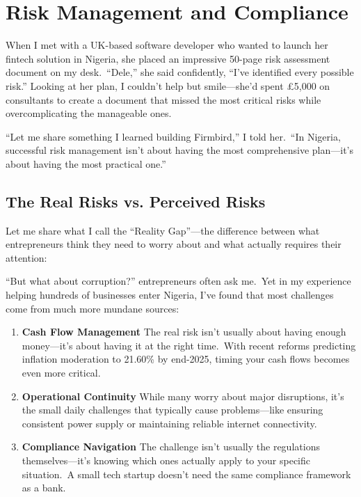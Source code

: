 \chapter{Risk Management and Compliance}\label{ch:risk-management-and-compliance}

\begin{importantbox}
When I met with a UK-based software developer who wanted to launch her fintech solution in Nigeria, she placed an impressive 50-page risk assessment document on my desk.\ ``Dele,'' she said confidently, ``I've identified every possible risk.'' Looking at her plan, I couldn't help but smile—she'd spent £5,000 on consultants to create a document that missed the most critical risks while overcomplicating the manageable ones.

``Let me share something I learned building Firmbird,'' I told her.\ ``In Nigeria, successful risk management isn't about having the most comprehensive plan—it's about having the most practical one.''
\end{importantbox}

\section{The Real Risks vs. Perceived Risks}\label{sec:real-vs-perceived-risks}

Let me share what I call the ``Reality Gap''—the difference between what entrepreneurs think they need to worry about and what actually requires their attention:

``But what about corruption?'' entrepreneurs often ask me.\ Yet in my experience helping hundreds of businesses enter Nigeria, I've found that most challenges come from much more mundane sources:

\begin{enumerate}
    \item \textbf{Cash Flow Management}
    The real risk isn't usually about having enough money—it's about having it at the right time.\ With recent reforms predicting inflation moderation to 21.60\% by end-2025, timing your cash flows becomes even more critical.
    
    \item \textbf{Operational Continuity}
    While many worry about major disruptions, it's the small daily challenges that typically cause problems—like ensuring consistent power supply or maintaining reliable internet connectivity.
    
    \item \textbf{Compliance Navigation}
    The challenge isn't usually the regulations themselves—it's knowing which ones actually apply to your specific situation.\ A small tech startup doesn't need the same compliance framework as a bank.
\end{enumerate}

